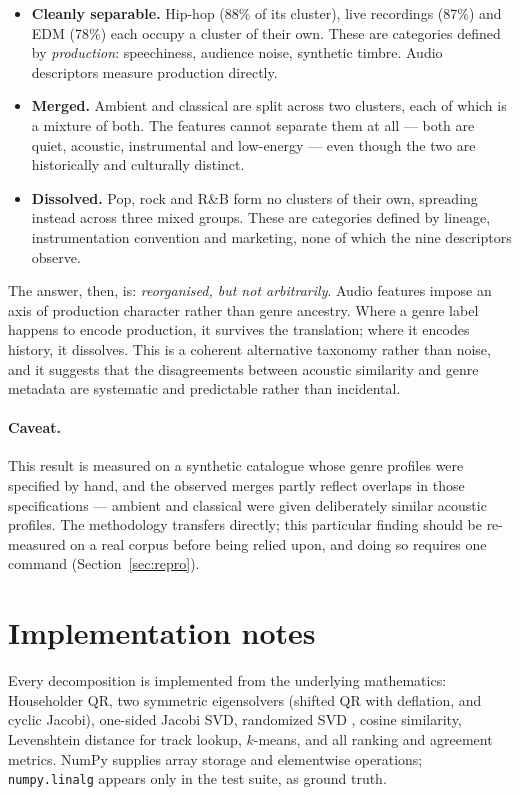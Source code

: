 \documentclass[11pt]{article}
\newcommand{\code}[1]{\texttt{\small #1}}
\begin{document}
\begin{itemize}
  \item \textbf{Cleanly separable.} Hip-hop (88\% of its cluster), live
        recordings (87\%) and EDM (78\%) each occupy a cluster of their own.
        These are categories defined by \emph{production}: speechiness,
        audience noise, synthetic timbre. Audio descriptors measure production
        directly.
  \item \textbf{Merged.} Ambient and classical are split across two clusters,
        each of which is a mixture of both. The features cannot separate them
        at all --- both are quiet, acoustic, instrumental and low-energy ---
        even though the two are historically and culturally distinct.
  \item \textbf{Dissolved.} Pop, rock and R\&B form no clusters of their own,
        spreading instead across three mixed groups. These are categories
        defined by lineage, instrumentation convention and marketing, none of
        which the nine descriptors observe.
\end{itemize}

The answer, then, is: \emph{reorganised, but not arbitrarily}. Audio features
impose an axis of production character rather than genre ancestry. Where a
genre label happens to encode production, it survives the translation; where it
encodes history, it dissolves. This is a coherent alternative taxonomy rather
than noise, and it suggests that the disagreements between acoustic similarity
and genre metadata are systematic and predictable rather than incidental.

\paragraph{Caveat.} This result is measured on a synthetic catalogue whose
genre profiles were specified by hand, and the observed merges partly reflect
overlaps in those specifications --- ambient and classical were given
deliberately similar acoustic profiles. The methodology transfers directly;
this particular finding should be re-measured on a real corpus before being
relied upon, and doing so requires one command (Section~\ref{sec:repro}).

\section{Implementation notes}
\label{sec:impl}

Every decomposition is implemented from the underlying mathematics: Householder
QR, two symmetric eigensolvers (shifted QR with deflation, and cyclic Jacobi),
one-sided Jacobi SVD, randomized SVD \cite{halko2011}, cosine similarity,
Levenshtein distance for track lookup, $k$-means, and all ranking and agreement
metrics. NumPy supplies array storage and elementwise operations;
\code{numpy.linalg} appears only in the test suite, as ground truth.
\end{document}
